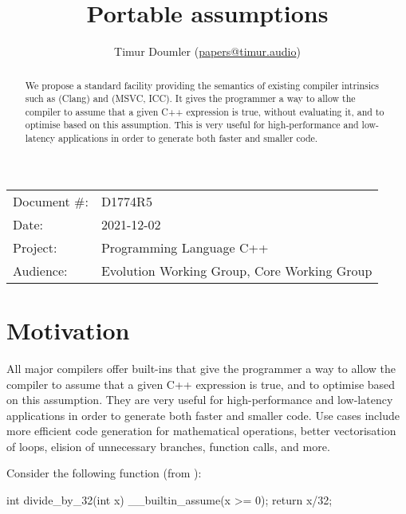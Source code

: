 

\newcommand{\forceindent}{\parindent=1em\indent\parindent=0pt\relax} %


\title{Portable assumptions}
\author{
  Timur Doumler \small(\href{mailto:papers@timur.audio}{papers@timur.audio})
}
\date{}
\maketitle

\begin{tabular}{ll}
Document \#: & D1774R5 \\
Date: & 2021-12-02\\
Project: & Programming Language C++ \\
Audience: & Evolution Working Group, Core Working Group
\end{tabular}


\begin{abstract}
We propose a standard facility providing the semantics of existing compiler intrinsics such as  (Clang) and  (MSVC, ICC). It gives the programmer a way to allow the compiler to assume that a given C++ expression is true, without evaluating it, and to optimise based on this assumption. This is very useful for high-performance and low-latency applications in order to generate both faster and smaller code.
\end{abstract}

\vspace{5mm}

\section{Motivation}

All major compilers offer built-ins that give the programmer a way to allow the compiler to assume that a given C++ expression is true, and to optimise based on this assumption. They are very useful for high-performance and low-latency applications in order to generate both faster and smaller code. Use cases include more efficient code generation for mathematical operations, better vectorisation of loops, elision of unnecessary branches, function calls, and more.

Consider the following function (from \cite{Regehr2014}):

\begin{codeblock}
int divide_by_32(int x) 
{
  __builtin_assume(x >= 0);
  return x/32;
}
\end{codeblock}

